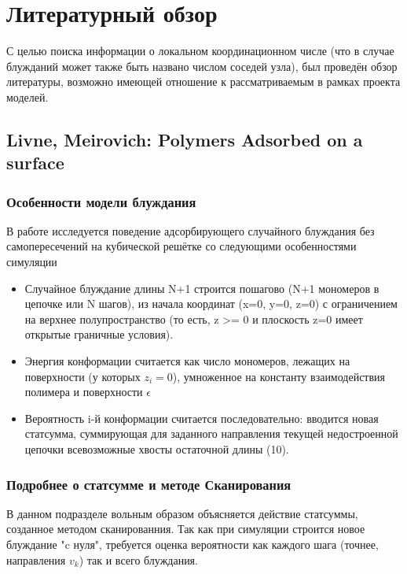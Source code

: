 \section{Литературный обзор}

С целью поиска информации о локальном координационном числе (что в случае блужданий может также быть названо числом соседей узла), был проведён обзор литературы, возможно имеющей отношение к рассматриваемым в рамках проекта моделей.

\subsection{Livne, Meirovich: Polymers Adsorbed on a surface}

\subsubsection{Особенности модели блуждания}

В работе \cite{LivneSAW1988} исследуется поведение адсорбирующего случайного блуждания без самопересечений на кубической решётке со следующими особенностями симуляции

\begin{itemize}
    \item Случайное блуждание длины N+1  строится пошагово (N+1 мономеров в цепочке или N шагов), из начала координат (x=0, y=0, z=0) с ограничением на верхнее полупространство (то есть, z >= 0 и плоскость z=0 имеет открытые граничные условия).
    \item Энергия конформации считается как число мономеров, лежащих на поверхности (у которых $z_{i} = 0$), умноженное на константу взаимодействия полимера и поверхности $\epsilon$
    \item Вероятность i-й конформации считается последовательно: вводится новая статсумма, суммирующая для заданного направления текущей недостроенной цепочки всевозможные хвосты остаточной длины (10)\cite{LivneSAW1988}. 
\end{itemize}

\subsubsection{Подробнее о статсумме и методе Сканирования }

В данном подразделе вольным образом объясняется действие статсуммы, созданное методом сканированния. Так как при симуляции строится новое блуждание "c нуля", требуется оценка вероятности как каждого шага (точнее, направления $v_{k}$) так и всего блуждания.

